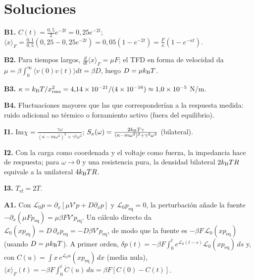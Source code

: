 \documentclass[11pt,a4paper]{article}
\begin{document}
\section{Soluciones}
\begin{solucion}
\textbf{B1.} $C(t)=\frac{0{,}5}{2}e^{-2t}=0{,}25e^{-2t}$; $\langle x\rangle_F=\frac{0{,}1}{0{,}5}(0{,}25-0{,}25e^{-2t})=0{,}05(1-e^{-2t})=\frac F\kappa(1-e^{-\kappa t})$.

\textbf{B2.} Para tiempos largos, $\frac{d}{dt}\langle x\rangle_F=\mu F$; el TFD en forma de velocidad da $\mu=\beta\int_0^\infty\langle v(0)v(t)\rangle dt=\beta D$, luego $D=\mu k_{\mathrm B} T$.

\textbf{B3.} $\kappa=k_{\mathrm B} T/x_{\text{rms}}^2=4{,}14\times10^{-21}/(4\times10^{-16})\approx1{,}0\times10^{-5}$ N/m.

\textbf{B4.} Fluctuaciones mayores que las que corresponderían a la respuesta medida: ruido adicional no térmico o forzamiento activo (fuera del equilibrio).

\textbf{I1.} $\mathrm{Im}\chi=\frac{\gamma\omega}{(\kappa-m\omega^2)^2+\gamma^2\omega^2}$; $S_x(\omega)=\frac{2k_{\mathrm B} T\gamma}{(\kappa-m\omega^2)^2+\gamma^2\omega^2}$ (bilateral).

\textbf{I2.} Con la carga como coordenada y el voltaje como fuerza, la impedancia hace de respuesta; para $\omega\to0$ y una resistencia pura, la densidad bilateral $2k_{\mathrm B} TR$ equivale a la unilateral $4k_{\mathrm B} TR$.

\textbf{I3.} $T_{\text{ef}}=2T$.

\textbf{A1.} Con $\mathcal L_0p=\partial_x[\mu V'p+D\partial_xp]$ y $\mathcal L_0p_{\text{eq}}=0$, la perturbación añade la fuente $-\partial_x(\mu Fp_{\text{eq}})=\mu\beta FV'p_{\text{eq}}$. Un cálculo directo da $\mathcal L_0(xp_{\text{eq}})=D\,\partial_xp_{\text{eq}}=-D\beta V'p_{\text{eq}}$, de modo que la fuente es $-\beta F\,\mathcal L_0(xp_{\text{eq}})$ (usando $D=\mu k_{\mathrm B} T$). A primer orden, $\delta p(t)=-\beta F\int_0^te^{\mathcal L_0(t-s)}\mathcal L_0(xp_{\text{eq}})\,ds$ y, con $C(u)=\int x\,e^{\mathcal L_0u}(xp_{\text{eq}})\,dx$ (media nula), $\langle x\rangle_F(t)=-\beta F\int_0^t\dot C(u)\,du=\beta F[C(0)-C(t)]$.
\end{solucion}
\end{document}
